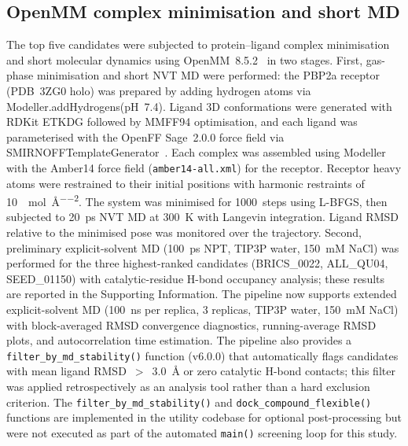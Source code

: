 \documentclass[12pt]{article}
\begin{document}
\subsection{OpenMM complex minimisation and short MD}
The top five candidates were subjected to protein--ligand complex minimisation and short molecular dynamics using OpenMM~8.5.2~\cite{eastman2017} in two stages. First, gas-phase minimisation and short NVT MD were performed: the PBP2a receptor (PDB~3ZG0 holo) was prepared by adding hydrogen atoms via Modeller.addHydrogens(pH~7.4). Ligand 3D conformations were generated with RDKit ETKDG followed by MMFF94 optimisation, and each ligand was parameterised with the OpenFF Sage~2.0.0 force field via SMIRNOFFTemplateGenerator~\cite{wagner2021}. Each complex was assembled using Modeller with the Amber14 force field ({\tt amber14-all.xml}) for the receptor. Receptor heavy atoms were restrained to their initial positions with harmonic restraints of 10~\si{\kcal\per\mol\per\square\angstrom}. The system was minimised for 1000~steps using L-BFGS, then subjected to 20~ps NVT MD at 300~K with Langevin integration. Ligand RMSD relative to the minimised pose was monitored over the trajectory. Second, preliminary explicit-solvent MD (100~ps NPT, TIP3P water, 150~mM NaCl) was performed for the three highest-ranked candidates (BRICS\_0022, ALL\_QU04, SEED\_01150) with catalytic-residue H-bond occupancy analysis; these results are reported in the Supporting Information. The pipeline now supports extended explicit-solvent MD (100~ns per replica, 3 replicas, TIP3P water, 150~mM NaCl) with block-averaged RMSD convergence diagnostics, running-average RMSD plots, and autocorrelation time estimation. The pipeline also provides a \texttt{filter\_by\_md\_stability()} function (v6.0.0) that automatically flags candidates with mean ligand RMSD~$>$~3.0~\si{\angstrom} or zero catalytic H-bond contacts; this filter was applied retrospectively as an analysis tool rather than a hard exclusion criterion. The \texttt{filter\_by\_md\_stability()} and \texttt{dock\_compound\_flexible()} functions are implemented in the utility codebase for optional post-processing but were not executed as part of the automated \texttt{main()} screening loop for this study.
\end{document}
